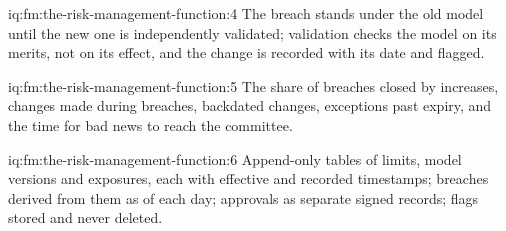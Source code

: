 \begin{solution}{iq:fm:the-risk-management-function:4}
The breach stands under the old model until the new one is independently validated; validation checks the model on its merits, not on its effect,
and the change is recorded with its date and flagged.
\end{solution}

\begin{solution}{iq:fm:the-risk-management-function:5}
The share of breaches closed by increases, changes made during breaches, backdated changes, exceptions past expiry, and the time for bad news to
reach the committee.
\end{solution}

\begin{solution}{iq:fm:the-risk-management-function:6}
Append-only tables of limits, model versions and exposures, each with effective and recorded timestamps; breaches derived from them as of each
day; approvals as separate signed records; flags stored and never deleted.
\end{solution}

